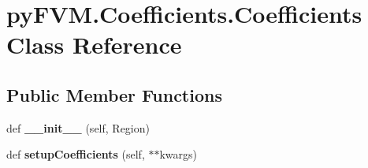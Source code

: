 \hypertarget{classpy_f_v_m_1_1_coefficients_1_1_coefficients}{}\section{py\+F\+V\+M.\+Coefficients.\+Coefficients Class Reference}
\label{classpy_f_v_m_1_1_coefficients_1_1_coefficients}
\subsection*{Public Member Functions}
\begin{DoxyCompactItemize}
\item 
\mbox{\label{classpy_f_v_m_1_1_coefficients_1_1_coefficients_ab888dd06989c0a757b950c5e92b70949}} 
def {\bfseries \+\_\+\+\_\+init\+\_\+\+\_\+} (self, Region)
\item 
\mbox{\label{classpy_f_v_m_1_1_coefficients_1_1_coefficients_aca689807251aba9ce8a02512061177dc}} 
def {\bfseries setup\+Coefficients} (self, $\ast$$\ast$kwargs)
\end{DoxyCompactItemize}
